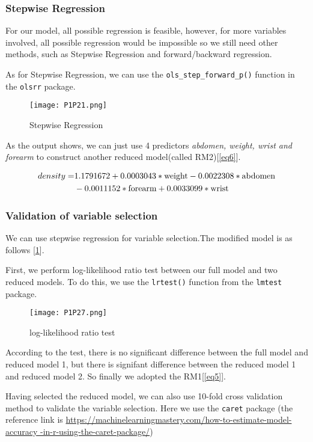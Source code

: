 \documentclass[11pt]{article}
\begin{document}
\subsubsection{Stepwise Regression}

For our model, all possible regression is feasible, however, for more variables involved, all possible regression would be impossible so we still need other methods, such as Stepwise Regression and forward/backward regression.

As for Stepwise Regression, we can use the \verb|ols_step_forward_p()| function in the \verb|olsrr| package.

\begin{figure}[htb]
\centering
\texttt{[image: P1P21.png]}
\caption{Stepwise Regression}\label{Fig18}
\end{figure}
                 
As the output shows, we can just use 4 predictors {\it abdomen, weight, wrist and forearm} to construct another reduced model(called RM2)[\ref{eq6}].   

 \begin{align}
density = &1.1791672+0.0003043*\text{weight}-0.0022308*\text{abdomen}\notag\\&-0.0011152*\text{forearm}+0.0033099*\text{wrist}\label{eq6}
\end{align}

                 
\subsubsection{Validation of variable selection}
We can use stepwise regression for variable selection.The modified model is as follows [\ref{Fig18}].

First, we perform log-likelihood ratio test between our full model and two reduced models. To do this, we use the \verb|lrtest()| function from the \verb|lmtest| package.

\begin{figure}[htb]
\centering
\texttt{[image: P1P27.png]}
\caption{log-likelihood ratio test}\label{Fig23}
\end{figure}

According to the test, there is no significant difference between the full model and reduced model 1, but there is signifant difference between the reduced model 1 and reduced model 2. So finally we adopted the RM1[\ref{eq5}].

Having selected the reduced model, we can also use 10-fold cross validation method to validate the variable selection. Here we use the \verb|caret| package (the reference link is \url {https://machinelearningmastery.com/how-to-estimate-model-accuracy -in-r-using-the-caret-package/})
\end{document}
